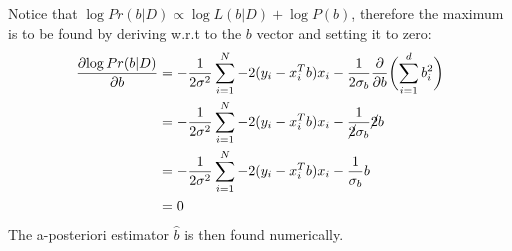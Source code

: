 Notice that \(\log{Pr}(b|D) \propto \log{L}(b|D) + \log{P}(b)\), therefore
the maximum is to be found by deriving w.r.t to the \(b\) vector and
setting it to zero:
\begin{align*}
    \frac{\partial{\log{Pr}(b|D)}}{\partial{b}}
    &=
    -\frac{1}{2\sigma^2}\sum_{i=1}^{N}-2(y_i-x_i^T b)x_i-\frac{1}{2\sigma_b}\frac{\partial}{\partial{b}}\biggl(\sum_{i=1}^{d}b_i^2\biggr) \\
    &=
    -\frac{1}{2\sigma^2}\sum_{i=1}^{N}-2(y_i-x_i^T b)x_i-\frac{1}{\cancel{2}\sigma_b}\cancel{2}b \\
    &=
    -\frac{1}{2\sigma^2}\sum_{i=1}^{N}-2(y_i-x_i^T b)x_i-\frac{1}{\sigma_b}b \\
    &=
    0
\end{align*}
The a-posteriori estimator \(\hat{b}\) is then found numerically.